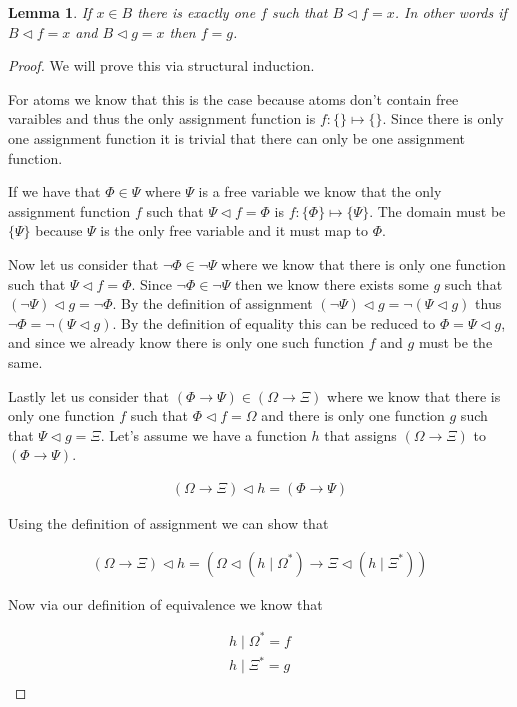 \documentclass{article}
\newtheorem{lem}{Lemma}
\begin{document}
\begin{lem}
If $x \in B$ there is exactly one $f$ such that $B \lhd f = x$.
In other words if $B \lhd f = x$ and $B \lhd g = x$ then $f = g$.
\end{lem}
\begin{proof}
We will prove this via structural induction.

For atoms we know that this is the case because atoms don't contain free varaibles and thus the only assignment function is $f : \{\} \mapsto \{\}$.
Since there is only one assignment function it is trivial that there can only be one assignment function.

If we have that $\Phi \in \Psi$ where $\Psi$ is a free variable we know that the only assignment function $f$ such that $\Psi \lhd f = \Phi$ is $f : \{\Phi\} \mapsto \{\Psi\}$.
The domain must be $\{\Psi\}$ because $\Psi$ is the only free variable and it must map to $\Phi$.

Now let us consider that $\neg \Phi \in \neg \Psi$ where we know that there is only one function such that $\Psi \lhd f = \Phi$.
Since $\neg \Phi \in \neg \Psi$ then we know there exists some $g$ such that $(\neg \Psi) \lhd g = \neg \Phi$.
By the definition of assignment $(\neg \Psi) \lhd g = \neg (\Psi \lhd g)$ thus $\neg \Phi = \neg (\Psi \lhd g)$.
By the definition of equality this can be reduced to $\Phi = \Psi \lhd g$, and since we already know there is only one such function $f$ and $g$ must be the same.

Lastly let us consider that $(\Phi \rightarrow \Psi) \in (\Omega \rightarrow \Xi)$
where we know that there is only one function $f$ such that $\Phi \lhd f = \Omega$
and there is only one function $g$ such that $\Psi \lhd g = \Xi$.
Let's assume we have a function $h$ that assigns $(\Omega \rightarrow \Xi)$ to $(\Phi \rightarrow \Psi)$.

\begin{align*}
(\Omega \rightarrow \Xi) \lhd h = (\Phi \rightarrow \Psi)
\end{align*}

Using the definition of assignment we can show that

\begin{align*}
(\Omega \rightarrow \Xi) \lhd h = (\Omega \lhd (h \mid \Omega^\ast) \rightarrow \Xi \lhd (h \mid \Xi^\ast))
\end{align*}

Now via our definition of equivalence we know that

\begin{align*}
h \mid \Omega^\ast = f \\
h \mid \Xi^\ast = g \\
\end{align*}


\end{proof}
\end{document}
